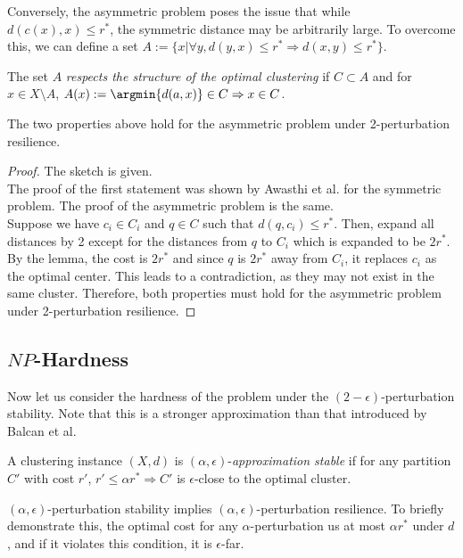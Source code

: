 Conversely, the asymmetric problem poses the issue that while $d(c(x),x)\leq r^*$, the symmetric distance may be arbitrarily large. To overcome this, we can define a set $A:=\{x|\forall y,d(y,x)\leq r^*\Rightarrow d(x,y)\leq r^*\}$.

\begin{definition}
The set $A$ \emph{respects the structure of the optimal clustering} if $C\subset A$ and for $x\in X\setminus A$, $A(x):=\argmin{d(a,x)}\in C\Rightarrow x\in C$.
\end{definition}

\begin{lemma}
The two properties above hold for the asymmetric problem under 2-perturbation resilience.
\end{lemma}

\begin{proof}
The sketch is given.\\

The proof of the first statement was shown by Awasthi et al. for the symmetric problem. The proof of the asymmetric problem is the same.\\

Suppose we have $c_i\in C_i$ and $q\in C$ such that $d(q,c_i)\leq r^*$. Then, expand all distances by 2 except for the distances from $q$ to $C_i$ which is expanded to be $2r^*$. By the lemma, the cost is $2r^*$ and since $q$ is $2r^*$ away from $C_i$, it replaces $c_i$ as the optimal center. This leads to a contradiction, as they may not exist in the same cluster. Therefore, both properties must hold for the asymmetric problem under 2-perturbation resilience.
\end{proof}

\subsection{$NP$-Hardness}

Now let us consider the hardness of the problem under the $(2-\epsilon)$-perturbation stability. Note that this is a stronger approximation than that introduced by Balcan et al.

\begin{definition}
A clustering instance $(X,d)$ is $(\alpha,\epsilon)$-\emph{approximation stable} if for any partition $C'$ with cost $r'$, $r'\leq\alpha r^*\Rightarrow C'$ is $\epsilon$-close to the optimal cluster.
\end{definition}

\begin{remark}
$(\alpha,\epsilon)$-perturbation stability implies $(\alpha,\epsilon)$-perturbation resilience. To briefly demonstrate this, the optimal cost for any $\alpha$-perturbation us at most $\alpha r^*$ under $d$, and if it violates this condition, it is $\epsilon$-far.
\end{remark}

